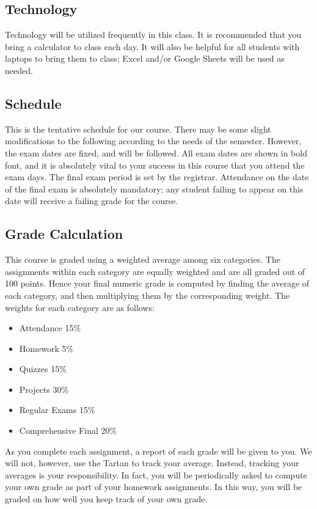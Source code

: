 \documentclass[11pt]{article}
\begin{document}
\subsection*{Technology}
Technology will be utilized frequently in this class. It is recommended that you bring a calculator to
class each day. It will also be helpful for all students with laptops to bring them to class; Excel and/or Google Sheets will be
used as needed.


\newpage
\subsection*{Schedule}

This is the tentative schedule for our course.  There may be some
slight modifications to the following according to the needs of the
semester. However, the exam dates are fixed, and will be followed.
All exam dates are shown in bold font, and it is absolutely vital to
your success in this course that you attend the exam days.  The final
exam period is set by the registrar.  Attendance on the date of the
final exam is absolutely mandatory; any student failing to appear on
this date will receive a failing grade for the course.



\subsection*{Grade Calculation}
This course is graded using a weighted average among six categories.  The assignments 
within each category are equally weighted and are all graded out of 100 points.  Hence your final numeric grade is computed by
finding the average of each category, and then multiplying them by the corresponding weight. The
weights for each category are as follows:

\begin{itemize}
    \item Attendance 15\%
    \item Homework 5\%
    \item Quizzes 15\%
    \item Projects 30\%
    \item Regular Exams 15\%
    \item Comprehensive Final 20\%
\end{itemize}

As you complete each assignment, a report of each grade will be given to you.  We will
not, however, use the Tartan to track your average.  Instead, tracking your averages
is your responsibility.  In fact, you will be periodically asked to compute your own grade
as part of your homework assignments.  In this way, you will be graded on how well you keep track of your
own grade.
\end{document}
